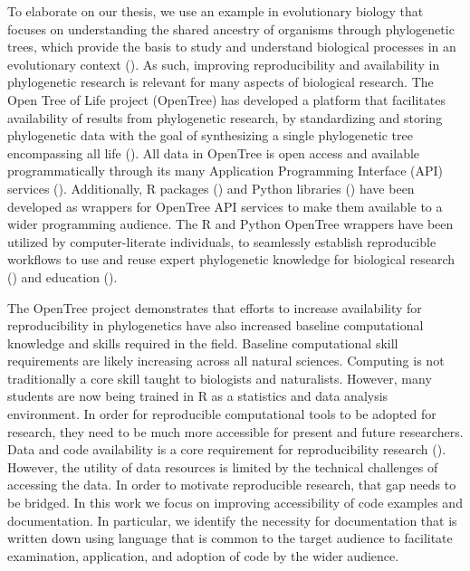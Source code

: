 \documentclass[12pt]{article}
\begin{document}
To elaborate on our thesis, we use an example in evolutionary biology that focuses
on understanding the shared ancestry of organisms through phylogenetic trees, which provide the
basis to study and understand biological processes in an evolutionary context (\cite{dobzhansky1973nothing}).
As such, improving reproducibility and availability
in phylogenetic research is relevant for many aspects of biological research.
The Open Tree of Life project (OpenTree) has developed a platform that facilitates
availability of results from phylogenetic research, by standardizing and storing
phylogenetic data with the goal of synthesizing a single phylogenetic tree encompassing
all life (\cite{opentreeoflife2019synth}).
All data in OpenTree is open access and available programmatically through its many
Application Programming Interface (API) services (\cite{opentreeAPIs}).
Additionally, R packages (\cite{michonneau2016rotl}) and Python libraries
(\cite{mctavish2021opentree}) have been developed as wrappers for OpenTree API services
to make them available to a wider programming audience.
The R and Python OpenTree wrappers have been utilized by computer-literate individuals,
to seamlessly establish reproducible workflows to use and reuse expert phylogenetic
knowledge for biological research (\cite{sanchez2019datelife}) and education
(\cite{nguyen2020phylotastic, phylotasticedtools, galacticedtools}).

The OpenTree project demonstrates that efforts to increase availability for reproducibility
in phylogenetics have also increased baseline computational knowledge and skills
required in the field.
Baseline computational skill requirements are likely increasing across all natural sciences.
Computing is not traditionally a core skill taught to biologists and naturalists.
However, many students are now being trained in R as a statistics and data analysis environment.
In order for reproducible computational tools to be adopted for research, they
 need to be much more accessible for present and future researchers.
Data and code availability is a core requirement for reproducibility research
 (\cite{peng2011reproducible, sandve2013ten, powers2019open}).
However, the utility of data resources is limited by the technical challenges of accessing the data.
In order to motivate reproducible research, that gap needs to be bridged.
In this work we focus on improving accessibility of code examples and documentation.
In particular, we identify the necessity for documentation that is written down
 using language that is common to the target audience to facilitate examination,
  application, and adoption of code by the wider audience.
\end{document}
